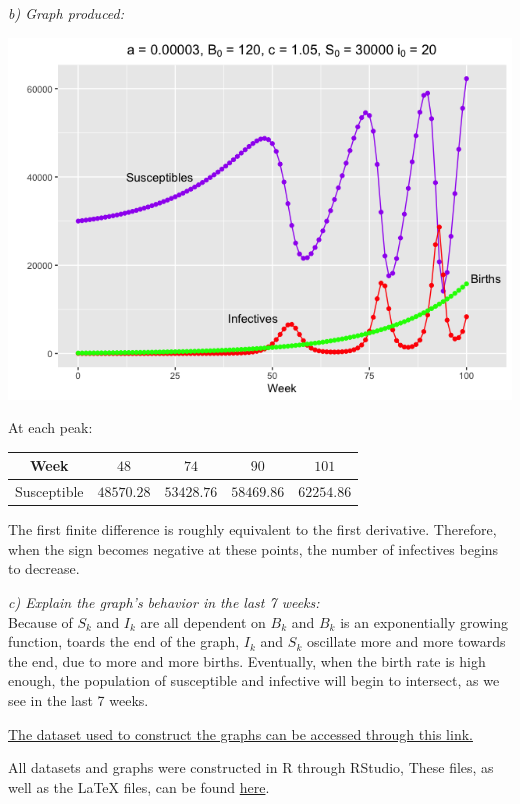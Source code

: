 \documentclass[12pt]{article}
\begin{document}
\break
\textit{b) Graph produced:}
\begin{center}
\includegraphics[width=15cm, ]{question2.png}
\end{center}

\begin{center}
At each peak: $\quad$
\begin{tabular}{ c | c c c c }
Week & $48$  & $74$ & $90$ & $101$\\
\hline
Susceptible & $48570.28$ & $53428.76$ & $58469.86$ & $62254.86$\\
\end{tabular}
\end{center}
The first finite difference is roughly equivalent to the first derivative. Therefore, when the sign becomes negative at these points, the number of infectives begins to decrease.

\textit{c) Explain the graph's behavior in the last 7 weeks:}\\
Because of $S_k$ and $I_k$ are all dependent on $B_k$ and $B_k$ is an exponentially growing function, toards the end of the graph, $I_k$ and $S_k$ oscillate more and more towards the end, due to more and more births. Eventually, when the birth rate is high enough, the population of susceptible and infective will begin to intersect, as we see in the last 7 weeks.

\begin{center}
\small \href{https://github.com/chenjoshua7/SIR_model_measles/blob/master/Problem%202/GPS5_Problem2_data.csv}{The dataset used to construct the graphs can be accessed through this link.}\\
\end{center}

\begin{center}
\normalsize All datasets and graphs were constructed in R through RStudio, These files, as well as the LaTeX files, can be found \href{https://github.com/chenjoshua7/SIR_model_measles}{here}.
\end{center}
\end{document}
